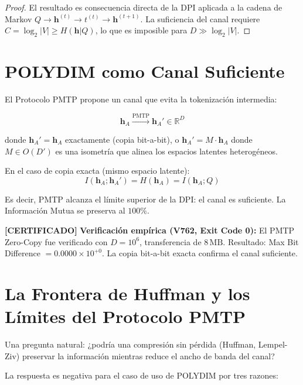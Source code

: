 \begin{proof}
El resultado es consecuencia directa de la DPI aplicada a la cadena de Markov
$Q \to \mathbf{h}^{(t)} \to t^{(t)} \to \mathbf{h}^{(t+1)}$. La suficiencia
del canal requiere $C = \log_2|V| \ge H(\mathbf{h}|Q)$, lo que es imposible
para $D \gg \log_2|V|$.
\end{proof}

\section{POLYDIM como Canal Suficiente}

El Protocolo PMTP propone un canal que evita la tokenización intermedia:

\begin{equation}
\mathbf{h}_A \xrightarrow{\text{PMTP}} \mathbf{h}_A' \in \mathbb{R}^{D}
\end{equation}

donde $\mathbf{h}_A' = \mathbf{h}_A$ exactamente (copia bit-a-bit), o
$\mathbf{h}_A' = M \cdot \mathbf{h}_A$ donde $M \in O(D')$ es una isometría
que alinea los espacios latentes heterogéneos.

En el caso de copia exacta (mismo espacio latente):
\begin{equation}
I(\mathbf{h}_A; \mathbf{h}_A') = H(\mathbf{h}_A) = I(\mathbf{h}_A; Q)
\end{equation}

Es decir, PMTP alcanza el límite superior de la DPI: el canal es suficiente.
La Información Mutua se preserva al $100\%$.

\textbf{[CERTIFICADO]} 
\textbf{Verificación empírica (V762, Exit Code 0):}
El PMTP Zero-Copy fue verificado con $D = 10^6$, transferencia de $8\,\text{MB}$.
Resultado: Max Bit Difference $= 0.0000 \times 10^{+0}$.
La copia bit-a-bit exacta confirma el canal suficiente.


\section{La Frontera de Huffman y los Límites del Protocolo PMTP}

Una pregunta natural: ¿podría una compresión sin pérdida (Huffman, Lempel-Ziv)
preservar la información mientras reduce el ancho de banda del canal?

La respuesta es negativa para el caso de uso de POLYDIM por tres razones:

